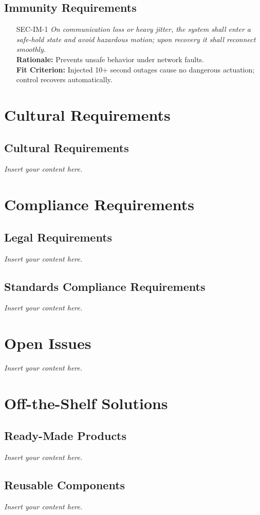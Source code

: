 \documentclass[12pt]{article}
\newcommand{\lips}{\textit{Insert your content here.}}
\begin{document}
\subsection{Immunity Requirements}
\begin{itemize}[leftmargin=*]
  \item[SEC-IM-1] \emph{On communication loss or heavy jitter, the system shall enter a safe-hold state and avoid hazardous motion; upon recovery it shall reconnect smoothly.}\\
  \textbf{Rationale:} Prevents unsafe behavior under network faults.\\
  \textbf{Fit Criterion:} Injected 10+ second outages cause no dangerous actuation; control recovers automatically.
\end{itemize}

\section{Cultural Requirements}
\subsection{Cultural Requirements}
\lips

\section{Compliance Requirements}
\subsection{Legal Requirements}
\lips
\subsection{Standards Compliance Requirements}
\lips

\section{Open Issues}
\lips

\section{Off-the-Shelf Solutions}
\subsection{Ready-Made Products}
\lips
\subsection{Reusable Components}
\lips
\end{document}
